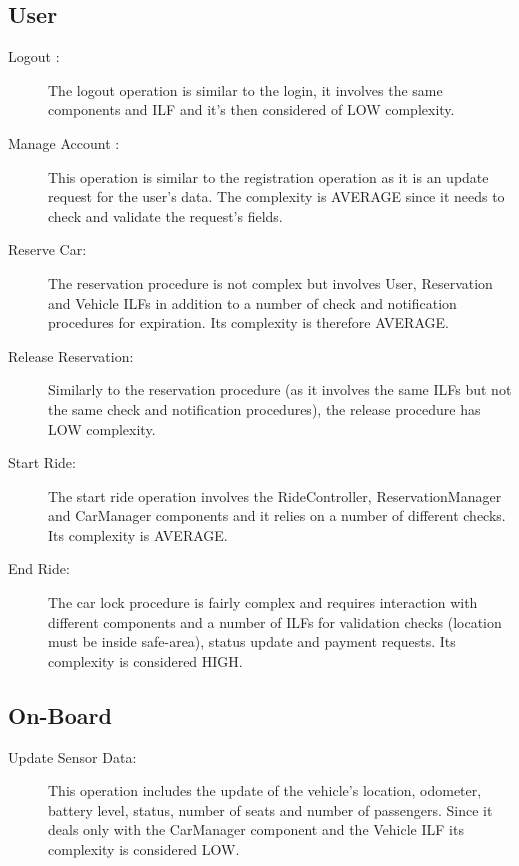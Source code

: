 \subsection{User}
\begin{description}
	\item [Logout :] The logout operation is similar to the login, it involves the same components and ILF and it's then considered of LOW complexity.
	\item [Manage Account :] This operation is similar to the registration operation as it is an update request for the user's data. The complexity is AVERAGE since it needs to check and validate the request's fields.
	\item [Reserve Car: ] The reservation procedure is not complex but involves User, Reservation and Vehicle ILFs in addition to a number of check and notification procedures for expiration. Its complexity is therefore AVERAGE.
	\item [Release Reservation: ] Similarly to the reservation procedure (as it involves the same ILFs but not the same check and notification procedures), the release procedure has LOW complexity.
	\item [Start Ride: ] The start ride operation involves the RideController, ReservationManager and CarManager components and it relies on a number of different checks. Its complexity is AVERAGE.
	\item [End Ride: ] The car lock procedure is fairly complex and requires interaction with different components and a number of ILFs for validation checks (location must be inside safe-area), status update and payment requests. Its complexity is considered HIGH.
\end{description}

\subsection{On-Board}
\begin{description}
	\item [Update Sensor Data: ] This operation includes the update of the vehicle's location, odometer, battery level, status, number of seats and number of passengers. Since it deals only with the CarManager component and the Vehicle ILF its complexity is considered LOW.
\end{description}

